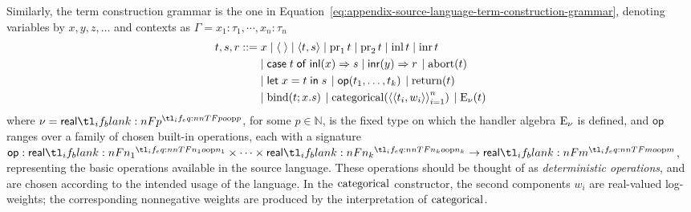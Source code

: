 \documentclass[11pt,a4paper]{article}
\theoremstyle{definition}
\theoremstyle{remark}
\providecommand{\N}{\mathbb{N}}
\providecommand{\srcop}{\mathsf{op}}
\providecommand{\casest}[5]{\mathsf{case}\;#1\;\mathsf{of}\;\mathsf{inl}(#2)\Rightarrow #3\;|\;\mathsf{inr}(#4)\Rightarrow #5}
\providecommand{\letst}[3]{\mathsf{let}\;#1=#2\;\mathsf{in}\;#3}
\begin{document}
Similarly, the term construction grammar is the one in Equation~\ref{eq:appendix-source-language-term-construction-grammar}, denoting variables by \( x, y, z, \dots \) and contexts as \( \Gamma = x_{1} : \tau_{1}, \cdots, x_{n} : \tau_{n} \)
\begin{equation}
  \label{eq:appendix-source-language-term-construction-grammar}
  \begin{aligned}
    t, s, r ::=
    &
      \left.
      x
      \mid
      \tuple{\;}
      \mid
      \tuple{t, s}
      \mid
      \opn[b]{pr}_{1} t
      \mid
      \opn[b]{pr}_{2} t
      \mid
      \opn[b]{inl} t
      \mid
      \opn[b]{inr} t
      \right. 
    \\
    &
      \left.
      \mid
      \casest{t}{x}{s}{y}{r}
      \right. 
    \left.
    \mid
    \fn[n]{ \opn[b]{abort} }{ t }
    \right. 
    \\
    &
      \left.
      \mid
      \letst{x}{t}{s}
      \right. 
    \left.
    \mid
    \fn[n]{ \srcop }{ t_{1}, \dots, t_{k} }
    \right. 
      \left.
      \mid
      \fn[n]{ \opn[b]{return} }{ t }
      \right. 
    \\
    &
      \left.
      \mid
      \fn[n]{ \opn[b]{bind} }{ t; x . s }
      \right. 
      \left.
      \mid
      \fn[n]{ \opn[b]{categorical} }{
      \tuple{
      \tuple{
      t_{i}, w_{i}
      }
      }_{i = 1}^{n}
      }
      \right. 
    \left.
    \mid
    \fn[n]{ \opn[b]{E}_{\nu} }{ t }
    \right. 
  \end{aligned}
\end{equation}
where \( \nu = \srcreal[p] \), for some \( p \in \N \), is the fixed type on which the handler algebra \( \opn[b]{E}_{\nu} \) is defined, and \( \srcop \) ranges over a family of chosen built-in operations, each with a signature \( \srcop: \srcreal[n_{1}] \times \cdots \times \srcreal[n_{k}] \to \srcreal[m] \), representing the basic operations available in the source language. These operations should be thought of as \emph{deterministic operations}, and are chosen according to the intended usage of the language. In the \( \opn[b]{categorical} \) constructor, the second components \( w_i \) are real-valued log-weights; the corresponding nonnegative weights are produced by the interpretation of \( \opn[b]{categorical} \).
\end{document}
